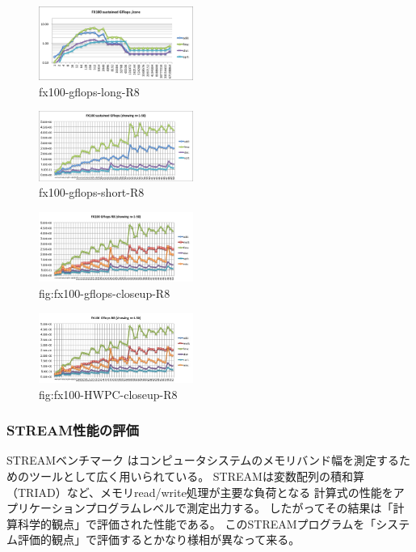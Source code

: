 \documentclass[submit,techrep,noauthor]{ipsj}
\begin{document}
\begin{figure}[tb]
\centering\includegraphics[width=0.45\textwidth]{figs/fx100-gflops-long-R8}
\caption{fx100-gflops-long-R8}
\label{fig:fx100-gflops-long-R8}
\end{figure}

\begin{figure}[tb]
\centering\includegraphics[width=0.45\textwidth]{figs/fx100-gflops-short-R8}
\caption{fx100-gflops-short-R8}
\label{fig:fx100-gflops-short-R8}
\end{figure}

\begin{figure}[tb]
\centering\includegraphics[width=0.45\textwidth]{figs/fx100-gflops-closeup-R8}
\caption{fig:fx100-gflops-closeup-R8}
\label{fig:fx100-gflops-closeup-R8}
\end{figure}

\begin{figure}[tb]
\centering\includegraphics[width=0.45\textwidth]{figs/fx100-HWPC-closeup-R8}
\caption{fig:fx100-HWPC-closeup-R8}
\label{fig:fx100-HWPC-closeup-R8}
\end{figure}




\subsubsection{STREAM性能の評価}
STREAMベンチマーク\cite{stream:1995}
はコンピュータシステムのメモリバンド幅を測定するためのツールとして広く用いられている。
STREAMは変数配列の積和算（TRIAD）など、メモリread/write処理が主要な負荷となる
計算式の性能をアプリケーションプログラムレベルで測定出力する。
したがってその結果は「計算科学的観点」で評価された性能である。
このSTREAMプログラムを「システム評価的観点」で評価するとかなり様相が異なって来る。
\end{document}

